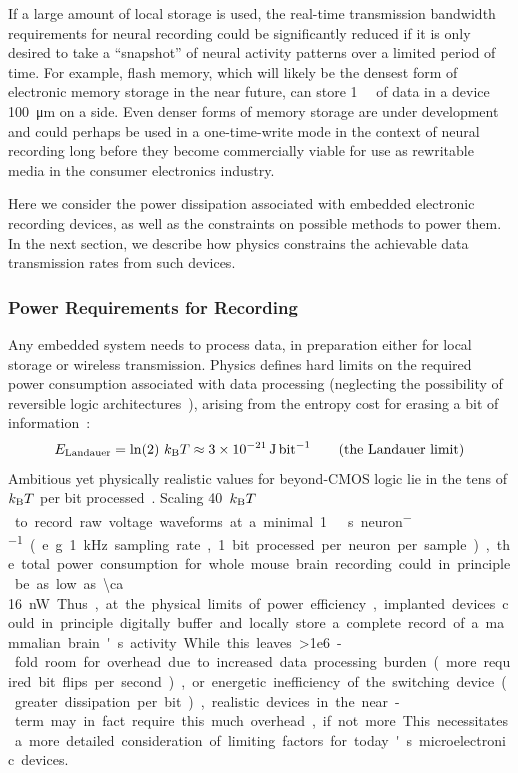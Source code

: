 If a large amount of local storage is used, the real-time transmission bandwidth requirements for neural recording could be significantly reduced if it is only desired to take a ``snapshot'' of neural activity patterns over a limited period of time.
For example, flash memory, which will likely be the densest form of electronic memory storage in the near future, can store \SI{1}{\mega\bit} of data in a device \SI{100}{\micro\meter} on a side.
Even denser forms of memory storage are under development and could perhaps be used in a one-time-write mode in the context of neural recording long before they become commercially viable for use as rewritable media in the consumer electronics industry.

Here we consider the power dissipation associated with embedded electronic recording devices, as well as the constraints on possible methods to power them.
In the next section, we describe how physics constrains the achievable data transmission rates from such devices.

\subsubsection{Power Requirements for Recording}

Any embedded system needs to process data, in preparation either for local storage or wireless transmission.
Physics defines hard limits on the required power consumption associated with data processing (neglecting the possibility of reversible logic architectures~\cite{bennett73}), arising from the entropy cost for erasing a bit of information~\cite{landauer61}:
\[E\sub{Landauer} = \ln(2)\ \kb T\approx \SI{3e-21}{\joule\per\bit} \label{eq:landauer} \tag{the Landauer limit}\]
Ambitious yet physically realistic values for beyond-CMOS logic lie in the tens of $k_{\text{\scriptsize B}} T$ per bit processed~\cite{yablonovitch08}.
Scaling \SI{40}{$k_{\text{\scriptsize B}} T$\per\bit} to record raw voltage waveforms at a minimal \SI{1}{\kilo\bit\per\second\per neuron} (e.g. \SI{1}{\kilo\hertz} sampling rate, 1 bit processed per neuron per sample), the total power consumption for whole mouse brain recording could in principle be as low as \SI{\ca 16}{\nano\watt}.
Thus, at the physical limits of power efficiency, implanted devices could in principle digitally buffer and locally store a complete record of a mammalian brain's activity.
While this leaves \num{>1e6}-fold room for overhead due to increased data processing burden (more required bit flips per second), or energetic inefficiency of the switching device (greater dissipation per bit), realistic devices in the near-term may in fact require this much overhead, if not more.
This necessitates a more detailed consideration of limiting factors for today's microelectronic devices.

